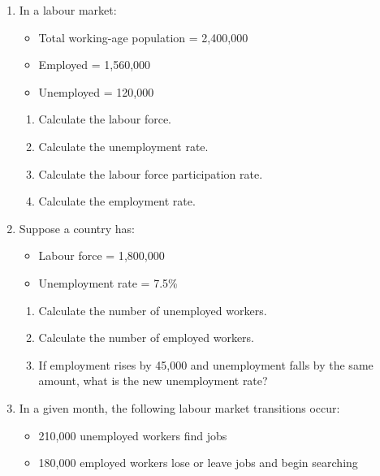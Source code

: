 \documentclass[12pt]{article}
\begin{document}
\begin{enumerate}[label=\textbf{Question \arabic*.}]
\begin{enumerate}[label=(\alph*)]
    \item Calculate the total points.
    \item If the passing score is 67, does the applicant qualify?
    \item If the applicant improves language points by 5, what is the new total?
    \item What is the minimum number of additional points needed to reach 67 if the applicant initially fails?
\end{enumerate}

\newpage
\item In a labour market:
\begin{itemize}
    \item Total working-age population = 2{,}400{,}000
    \item Employed = 1{,}560{,}000
    \item Unemployed = 120{,}000
\end{itemize}

\begin{enumerate}[label=(\alph*)]
    \item Calculate the labour force.
    \item Calculate the unemployment rate.
    \item Calculate the labour force participation rate.
    \item Calculate the employment rate.
\end{enumerate}

\item Suppose a country has:
\begin{itemize}
    \item Labour force = 1{,}800{,}000
    \item Unemployment rate = 7.5\%
\end{itemize}

\begin{enumerate}[label=(\alph*)]
    \item Calculate the number of unemployed workers.
    \item Calculate the number of employed workers.
    \item If employment rises by 45{,}000 and unemployment falls by the same amount, what is the new unemployment rate?
\end{enumerate}

\item In a given month, the following labour market transitions occur:
\begin{itemize}
    \item 210{,}000 unemployed workers find jobs
    \item 180{,}000 employed workers lose or leave jobs and begin searching
\end{itemize}


\end{enumerate}
\end{document}
